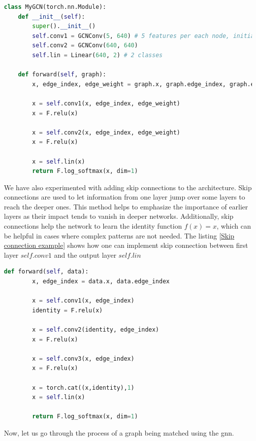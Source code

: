 \begin{lstlisting}[caption={Pytorch GCN for the line graph}, label={Pytorch GCN for the line graph}, language=Python]
class MyGCN(torch.nn.Module):
    def __init__(self):
        super().__init__()
        self.conv1 = GCNConv(5, 640) # 5 features per each node, initialy 1
        self.conv2 = GCNConv(640, 640)
        self.lin = Linear(640, 2) # 2 classes 

    def forward(self, graph):        
        x, edge_index, edge_weight = graph.x, graph.edge_index, graph.edge_weight
        
        x = self.conv1(x, edge_index, edge_weight)
        x = F.relu(x)
        
        x = self.conv2(x, edge_index, edge_weight)
        x = F.relu(x)
        
        x = self.lin(x)
        return F.log_softmax(x, dim=1)    
\end{lstlisting}

We have also experimented with adding skip connections to the architecture. Skip connections are used to let information from one layer jump over some layers to reach the deeper ones. This method helps to emphasize the importance of earlier layers as their impact tends to vanish in deeper networks. Additionally, skip connections help the network to learn the identity function $f(x) = x$, which can be helpful in cases where complex patterns are not needed. The listing \ref{Skip connection example} shows how one can implement skip connection between first layer $self.conv1$ and the output layer $self.lin$

\begin{lstlisting}[caption={Skip connection example}, label={Skip connection example}, language=Python]
def forward(self, data):        
        x, edge_index = data.x, data.edge_index
        
        x = self.conv1(x, edge_index)
        identity = F.relu(x)
        
        x = self.conv2(identity, edge_index)
        x = F.relu(x)
        
        x = self.conv3(x, edge_index)
        x = F.relu(x)

        x = torch.cat((x,identity),1)
        x = self.lin(x)
        
        return F.log_softmax(x, dim=1)
\end{lstlisting}

Now, let us go through the process of a graph being matched using the \gls{gnn}.

